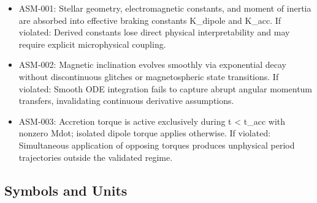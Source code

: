\documentclass[11pt]{article}
\begin{document}
\begin{itemize}\raggedright
\item ASM-001: Stellar geometry, electromagnetic constants, and moment of inertia are absorbed into effective braking constants K\_\allowbreak{}dipole and K\_\allowbreak{}acc. If violated: Derived constants lose direct physical interpretability and may require explicit microphysical coupling.
\item ASM-002: Magnetic inclination evolves smoothly via exponential decay without discontinuous glitches or magnetospheric state transitions. If violated: Smooth ODE integration fails to capture abrupt angular momentum transfers, invalidating continuous derivative assumptions.
\item ASM-003: Accretion torque is active exclusively during t < t\_\allowbreak{}acc with nonzero Mdot; isolated dipole torque applies otherwise. If violated: Simultaneous application of opposing torques produces unphysical period trajectories outside the validated regime.
\end{itemize}

\subsection{Symbols and Units}
\end{document}
